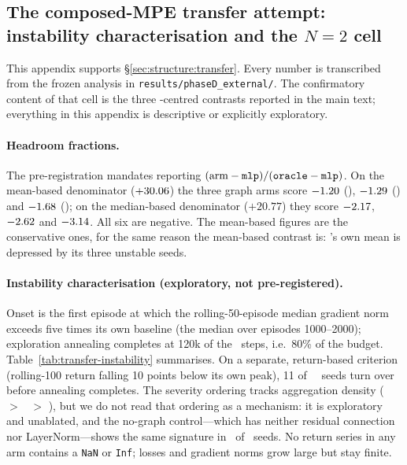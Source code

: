 \begin{appendices}
\section{The composed-MPE transfer attempt: instability characterisation and
the \texorpdfstring{$N{=}2$}{N=2} cell}
\label{app:transfer}

This appendix supports \S\ref{sec:structure:transfer}. Every number is
transcribed from the frozen analysis in \texttt{results/phaseD\_external/}.
The confirmatory content of that cell is the three \gtrue-centred contrasts
reported in the main text; everything in this appendix is descriptive or
explicitly exploratory.

\paragraph{Headroom fractions.} The pre-registration mandates reporting
$(\text{arm}-\texttt{mlp})/(\texttt{oracle}-\texttt{mlp})$. On the mean-based denominator
($+30.06$) the three graph arms score $-1.20$ (\gtrue), $-1.29$
(\gwrong) and $-1.68$ (\gcomplete); on the median-based denominator
($+20.77$) they score $-2.17$, $-2.62$ and $-3.14$.
All six are negative. The mean-based figures are the conservative ones, for the
same reason the mean-based contrast is: \mlpc's own mean is depressed by its
three unstable seeds.

\paragraph{Instability characterisation (exploratory, not pre-registered).}
Onset is the first episode at which the rolling-50-episode median gradient norm
exceeds five times its own baseline (the median over episodes 1000--2000);
exploration annealing completes at 120k of the \PDsteps\ steps, i.e.\ 80\% of
the budget. Table~\ref{tab:transfer-instability} summarises. On a separate,
return-based criterion (rolling-100 return falling 10 points below its own
peak), 11 of \PDseeds\ \gtrue\ seeds turn over before annealing completes. The
severity ordering tracks aggregation density (\gcomplete\ $>$ \gwrong\ $>$
\gtrue), but we do not read that ordering as a mechanism: it is exploratory and
unablated, and the no-graph control---which has neither residual connection nor
LayerNorm---shows the same signature in \PDblowMlp\ of \PDseeds\ seeds. No
return series in any arm contains a \texttt{NaN} or \texttt{Inf}; losses and
gradient norms grow large but stay finite.


\end{appendices}
